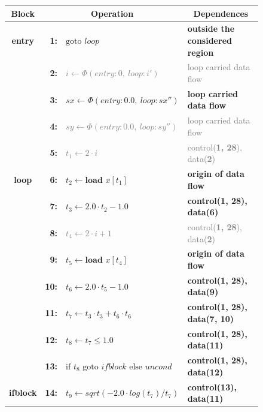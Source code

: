\begin{figure}[p]
\centering
\begin{tabular}{|c|rl|l|}
\hline
\multicolumn{1}{|c}{\bf Block} &  \multicolumn{2}{|c|}{\bf Operation} & \multicolumn{1}{c|}{\bf Dependences} \\
\hline
\hline
\multirow{1}{*}{\bf entry}
  & {\bf 1:} & \textcolor{color_strings}{$\text{goto }loop$}&\textcolor{color_strings}{\bf outside the considered region}\\
\hline
\multirow{9}{*}{\bf loop\vspace{4.5mm}}
  & {\bf  2:} & \textcolor{gray}{$i\leftarrow \Phi(entry:0,\ loop:i')$}&\textcolor{gray}{loop carried data flow}\\[-1.7mm]
  & {\bf  3:} & \textcolor{color_types}{$sx\leftarrow \Phi(entry:0.0,\ loop:sx'')$}&\textcolor{color_types}{\bf loop carried data flow}\\[-1.7mm]
  & {\bf  4:} & \textcolor{gray}{$sy\leftarrow \Phi(entry:0.0,\ loop:sy'')$}&\textcolor{gray}{loop carried data flow}\\[-1.7mm]
  & {\bf  5:} & \textcolor{gray}{$t_1\leftarrow 2\cdot i$}&\textcolor{gray}{control({\bf 1, 28}), data({\bf 2})}\\[-1.7mm]
  & {\bf  6:} & \textcolor{color_types}{$t_2\leftarrow\textbf{load }x[t_1]$}&\textcolor{color_types}{\bf origin of data flow}\\[-1.7mm]
  & {\bf  7:} & $t_3\leftarrow 2.0\cdot t_2-1.0$&{\bf control({\bf 1, 28}), data({\bf 6})}\\[-1.7mm]
  & {\bf  8:} & \textcolor{gray}{$t_4\leftarrow 2\cdot i+1$}&\textcolor{gray}{control({\bf 1, 28}), data({\bf 2})}\\[-1.7mm]
  & {\bf  9:} & \textcolor{color_types}{$t_5\leftarrow\textbf{load }x[t_4]$}&\textcolor{color_types}{\bf origin of data flow}\\[-1.7mm]
  & {\bf 10:} & $t_6\leftarrow 2.0\cdot t_5-1.0$&{\bf control({\bf 1, 28}), data({\bf 9})}\\[-1.7mm]
  & {\bf 11:} & $t_7\leftarrow t_3\cdot t_3+t_6\cdot t_6$&{\bf control({\bf 1, 28}), data({\bf 7, 10})}\\[-1.7mm]
  & {\bf 12:} & $t_8\leftarrow t_7\leq1.0$&{\bf control({\bf 1, 28}), data({\bf 11})}\\[-1.7mm]
  & {\bf 13:} & $\text{if }t_8\text{ goto }ifblock\text{ else }uncond$&{\bf control({\bf 1, 28}), data({\bf 12})}\\
\hline
\multirow{8}{*}{\bf ifblock\vspace{3mm}}
 & {\bf 14:} & $t_9\leftarrow sqrt(-2.0\cdot log(t_7) / t_7)$&{\bf control({\bf 13}), data({\bf 11})}\\[-1.7mm]

\end{tabular}
\end{figure}
